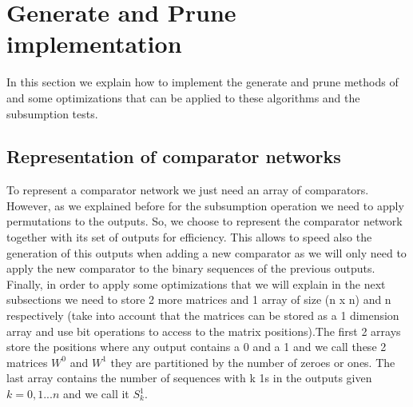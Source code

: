 \documentclass[../main.tex]{subfiles}
\begin{document}
	\section{Generate and Prune implementation}
	In this section we explain how to implement the generate and prune methods of \cite{sortingnineinputs} and some optimizations that can be applied to these algorithms and the subsumption tests. 
	
	\subsection{Representation of comparator networks}
	To represent a comparator network we just need an array of comparators. However, as we explained before for the subsumption operation we need to apply permutations to the outputs. So, we choose to represent the comparator network together with its set of outputs for efficiency. This allows to speed also the generation of this outputs when adding a new comparator as we will only need to apply the new comparator to the binary sequences of the previous outputs. Finally, in order to apply some optimizations that we will explain in the next subsections we need to store 2 more matrices and 1 array of size (n x n) and n respectively (take into account that the matrices can be stored as a 1 dimension array and use bit operations to access to the matrix positions).The first 2 arrays store the positions where any output contains a 0 and a 1 and we call  these 2 matrices $W^0$ and $W^1$ they are partitioned by the number of zeroes or ones. The last array contains the number of sequences with k 1s in the outputs given $k=0,1...n$ and we call it $S^{1}_k$.
	
\end{document}
